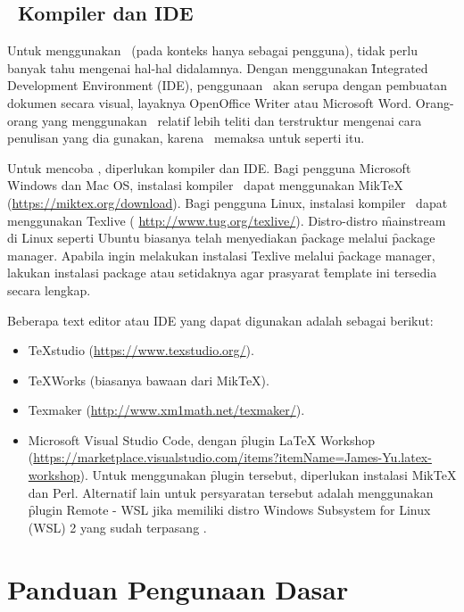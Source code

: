 \subsection{\latex~Kompiler dan IDE}
\label{sec:latexCompiler}
Untuk menggunakan \latex~(pada konteks hanya sebagai pengguna), tidak perlu banyak tahu mengenai hal-hal didalamnya.
Dengan menggunakan \f{Integrated Development Environment} (IDE), penggunaan \latex~akan serupa dengan pembuatan dokumen secara visual, layaknya OpenOffice Writer atau Microsoft Word.
Orang-orang yang menggunakan \latex~relatif lebih teliti dan terstruktur mengenai cara penulisan yang dia gunakan, karena \latex~memaksa untuk seperti itu.

Untuk mencoba \latex, diperlukan kompiler dan IDE.
Bagi pengguna Microsoft Windows dan Mac OS, instalasi kompiler \latex~dapat menggunakan MikTeX (\url{https://miktex.org/download}).
Bagi pengguna Linux, instalasi kompiler \latex~dapat menggunakan Texlive ( \url{http://www.tug.org/texlive/}).
Distro-distro \f{mainstream} di Linux seperti Ubuntu biasanya telah menyediakan \f{package}  melalui \f{package manager}.
Apabila ingin melakukan instalasi Texlive melalui \f{package manager}, lakukan instalasi package  atau setidaknya  agar prasyarat \f{template} ini tersedia secara lengkap.

Beberapa text editor atau IDE yang dapat digunakan adalah sebagai berikut:
\begin{itemize}
	\item TeXstudio (\url{https://www.texstudio.org/}).
	\item TeXWorks (biasanya bawaan dari MikTeX).
	\item Texmaker (\url{http://www.xm1math.net/texmaker/}).
	\item Microsoft Visual Studio Code, dengan \f{plugin} LaTeX Workshop (\url{https://marketplace.visualstudio.com/items?itemName=James-Yu.latex-workshop}).
	Untuk menggunakan \f{plugin} tersebut, diperlukan instalasi MikTeX dan Perl.
	Alternatif lain untuk persyaratan tersebut adalah menggunakan \f{plugin} Remote - WSL jika memiliki distro Windows Subsystem for Linux (WSL) 2 yang sudah terpasang .
\end{itemize}


\section{Panduan Pengunaan Dasar \latex}
\label{sec:latexUsage}

